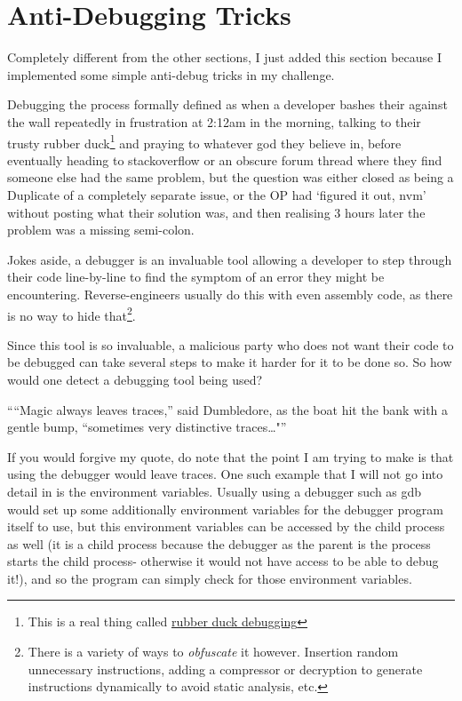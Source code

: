 \documentclass[twocolumn, a4paper,12pt]{article}
\begin{document}
\section{Anti-Debugging Tricks}
Completely different from the other sections, I just added this section because I implemented some simple anti-debug tricks in
my challenge.

Debugging the process formally defined as when a developer bashes their against the wall repeatedly in frustration at 2:12am in the morning,
talking to their trusty rubber duck\footnote{This is a real thing called \href{https://en.wikipedia.org/wiki/Rubber_duck_debugging}{rubber duck debugging}} and praying to whatever god they believe in, before eventually heading to stackoverflow or an obscure forum thread where they
find someone else had the same problem, but the question was either closed as being a Duplicate of a completely separate issue, or the OP
had `figured it out, nvm' without posting what their solution was, and then realising 3 hours later the problem was a missing semi-colon.

Jokes aside, a debugger is an invaluable tool allowing a developer to step through their code line-by-line to find the symptom of an error
they might be encountering. Reverse-engineers usually do this with even assembly code, as there is no way to hide that\footnote{
There is a variety of ways to \textit{obfuscate} it however. Insertion random unnecessary instructions, adding a compressor or decryption
to generate instructions dynamically to avoid static analysis, etc.}. 

Since this tool is so invaluable, a malicious party who does not want their code to be debugged can take several steps to make it harder for
it to be done so. So how would one detect a debugging tool being used?

``“Magic always leaves traces,” said Dumbledore, as the boat hit the bank with a gentle bump, “sometimes very distinctive traces\ldots"''

If you would forgive my quote, do note that the point I am trying to make is that using the debugger would leave traces.
One such example that I will not go into detail in is the environment variables. Usually using a debugger such as gdb would set up
some additionally environment variables for the debugger program itself to use, but this environment variables can be accessed by
the child process as well (it is a child process because the debugger as the parent is the process starts the child process- otherwise it
would not have access to be able to debug it!), and so the program can simply check for those environment variables.
\end{document}
